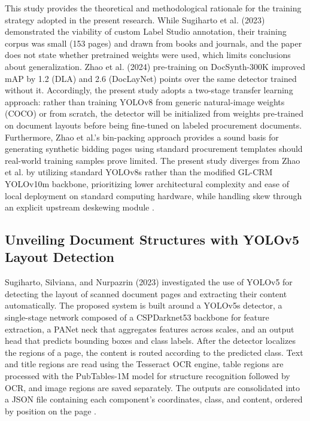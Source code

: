 This study provides the theoretical and methodological rationale for the training strategy adopted in the present research.
While Sugiharto et al. (2023) demonstrated the viability of custom Label Studio annotation, their training corpus was small (153 pages) and drawn from books and journals, and the paper does not state whether pretrained weights were used, which limits conclusions about generalization.
Zhao et al. (2024) pre-training on DocSynth-300K improved mAP by 1.2 (DLA) and 2.6 (DocLayNet) points over the same detector trained without it.
Accordingly, the present study adopts a two-stage transfer learning approach: rather than training YOLOv8 from generic natural-image weights (COCO) or from scratch, the detector will be initialized from weights pre-trained on document layouts before being fine-tuned on labeled procurement documents.
Furthermore, Zhao et al.'s bin-packing approach provides a sound basis for generating synthetic bidding pages using standard procurement templates should real-world training samples prove limited.
The present study diverges from Zhao et al. by utilizing standard YOLOv8s rather than the modified GL-CRM YOLOv10m backbone, prioritizing lower architectural complexity and ease of local deployment on standard computing hardware, while handling skew through an explicit upstream deskewing module \cite{ref50}.

\subsection{Unveiling Document Structures with YOLOv5 Layout Detection}

Sugiharto, Silviana, and Nurpazrin (2023) investigated the use of YOLOv5 for detecting the layout of scanned document pages and extracting their content automatically.
The proposed system is built around a YOLOv5s detector, a single-stage network composed of a CSPDarknet53 backbone for feature extraction, a PANet neck that aggregates features across scales, and an output head that predicts bounding boxes and class labels.
After the detector localizes the regions of a page, the content is routed according to the predicted class.
Text and title regions are read using the Tesseract OCR engine, table regions are processed with the PubTables-1M model for structure recognition followed by OCR, and image regions are saved separately.
The outputs are consolidated into a JSON file containing each component's coordinates, class, and content, ordered by position on the page \cite{ref51}.

